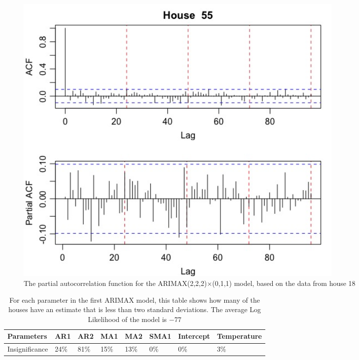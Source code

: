 \begin{figure}
    \centering
    \includegraphics[width=0.8\textwidth]{../../../figures/arimax/Arimax1_55.jpeg}
    \caption{The partial autocorrelation function for the ARIMAX(2,2,2)$\times$(0,1,1) model, based on the data from house 18}
    \label{arimax1_55}
\end{figure}

\begin{table}[]
    \begin{tabular}{|l|l|l|l|l|l|l|l|}
    \hline
    Parameters     & AR1  & AR2  & MA1  & MA2  & SMA1 & Intercept & Temperature \\ \hline
    Insignificance & 24\% & 81\% & 15\% & 13\% & 0\%  & 0\%       & 3\%         \\ \hline
    \end{tabular}
    \caption{For each parameter in the first ARIMAX model, this table shows how many of the houses have an estimate that is less than two standard deviations. The average Log Likelihood of the model is $-77$}
    \label{First arimax}
    \end{table}
